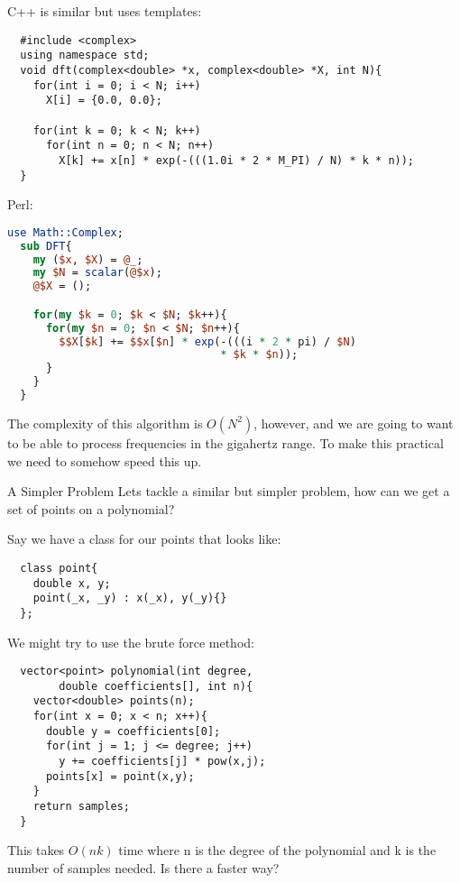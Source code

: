 \documentclass{beamer}
\begin{document}
\begin{frame}[fragile]
  C++ is similar but uses templates:
  \begin{lstlisting}
  #include <complex>
  using namespace std;
  void dft(complex<double> *x, complex<double> *X, int N){
    for(int i = 0; i < N; i++)
      X[i] = {0.0, 0.0};

    for(int k = 0; k < N; k++)
      for(int n = 0; n < N; n++)
        X[k] += x[n] * exp(-(((1.0i * 2 * M_PI) / N) * k * n));
  }
\end{lstlisting}
\end{frame}
\begin{frame}[fragile]

  Perl:
  \begin{lstlisting}[language=Perl]
  use Math::Complex;
  sub DFT{
    my ($x, $X) = @_;
    my $N = scalar(@$x);
    @$X = ();

    for(my $k = 0; $k < $N; $k++){
      for(my $n = 0; $n < $N; $n++){
        $$X[$k] += $$x[$n] * exp(-(((i * 2 * pi) / $N)
                                 * $k * $n));
      }
    }
  }
\end{lstlisting}

  The complexity of this algorithm is $O(N^2)$, however, and we are going to want to be able to process frequencies in the gigahertz range. To make this practical we need to somehow speed this up.

\end{frame}
\begin{frame}[fragile]{A Simpler Problem}
  Lets tackle a similar but simpler problem, how can we get a set of points on a polynomial?

  Say we have a class for our points that looks like:
  \begin{lstlisting}
  class point{
    double x, y;
    point(_x, _y) : x(_x), y(_y){}
  };
\end{lstlisting}
  We might try to use the brute force method:
  \begin{lstlisting}
  vector<point> polynomial(int degree,
        double coefficients[], int n){
    vector<double> points(n);
    for(int x = 0; x < n; x++){
      double y = coefficients[0];
      for(int j = 1; j <= degree; j++)
        y += coefficients[j] * pow(x,j);
      points[x] = point(x,y);
    }
    return samples;
  }
\end{lstlisting}
\end{frame}

\begin{frame}
  This takes $O(nk)$ time where n is the degree of the polynomial and k is the number of samples needed. Is there a faster way?
\end{frame}
\end{document}
